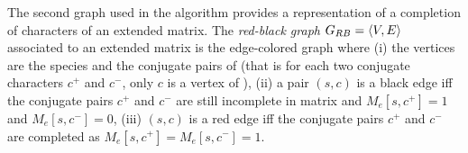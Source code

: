 




The second graph used in the algorithm provides a representation of a  completion of characters of an extended matrix.
The \emph{red-black graph} $G_{RB}=\langle V,E \rangle$  associated to an extended matrix \me
is the edge-colored graph where (i)
the vertices are the species and the conjugate pairs of \me (that is
for each two conjugate
characters $c^{+}$ and $c^{-}$, only $c$ is a vertex of \grb), (ii) a pair $(s,c)$
is a black edge iff the conjugate pairs
$c^{+}$ and $c^{-}$ are still incomplete in matrix \me and
$M_e[s,c^{+}]=1$ and
$M_e[s,c^{-}]=0$, (iii)
$(s,c)$ is a red edge iff the conjugate pairs
$c^{+}$ and $c^{-}$ are completed as $M_e[s,c^{+}]=M_e[s,c^{-}]=1$.







